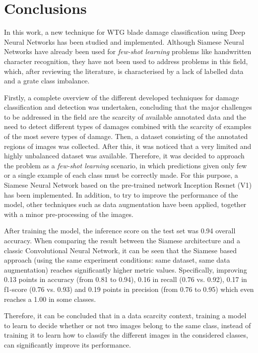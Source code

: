 \label{conclusions}
\section{Conclusions}
In this work, a new technique for WTG blade damage classification using Deep Neural Networks has been studied and implemented. Although Siamese Neural Networks have already been used for \emph{few-shot learning} problems like handwritten character recognition, they have not been used to address problems in this field, which, after reviewing the literature, is characterised by a lack of labelled data and a grate class imbalance.

Firstly, a complete overview of the different developed techniques for damage classification and detection was undertaken, concluding that the major challenges to be addressed in the field are the scarcity of available annotated data and the need to detect different types of damages combined with the scarcity of examples of the most severe types of damage. Then, a dataset consisting of the annotated regions of images was collected. After this, it was noticed that a very limited and highly unbalanced dataset was available. Therefore, it was decided to approach the problem as a \emph{few-shot learning} scenario, in which predictions given only few or a single example of each class must be correctly made. For this purpose, a Siamese Neural Network based on the pre-trained network Inception Resnet (V1) has been implemented. In addition, to try to improve the performance of the model, other techniques such as data augmentation have been applied, together with a minor pre-processing of the images. 

After training the model, the inference score on the test set was 0.94 overall accuracy. When comparing the result between the Siamese architecture and a classic Convolutional Neural Network, it can be seen that the Siamese based approach (using the same experiment conditions: same dataset, same data augmentation) reaches significantly higher metric values. Specifically, improving 0.13 points in accuracy (from 0.81 to 0.94), 0.16 in recall (0.76 vs. 0.92), 0.17 in f1-score (0.76 vs. 0.93) and 0.19 points in precision (from 0.76 to 0.95) which even reaches a 1.00 in some classes.

Therefore, it can be concluded that in a data scarcity context, training a model to learn to decide whether or not two images belong to the same class, instead of training it to learn how to classify the different images in the considered classes, can significantly improve its performance.

